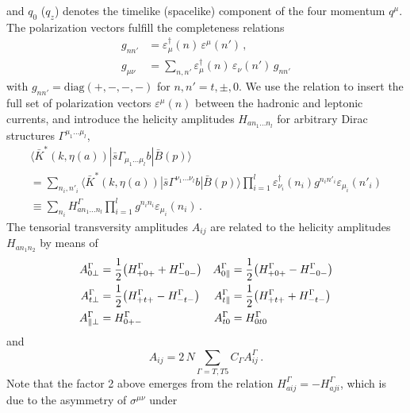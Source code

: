 and $q_0$ ($q_z$) denotes the timelike (spacelike) component of the four
momentum $q^\mu$. The polarization vectors fulfill the completeness relations
\begin{equation}
\begin{aligned}
    g_{nn'} & = \varepsilon^\dagger_\mu(n)\, \varepsilon^\mu(n')\,,\\
 g_{\mu\nu} & = \sum_{n,n'} \varepsilon^\dagger_\mu(n)\, \varepsilon_\nu(n')\, g_{nn'}
\end{aligned}\label{eq:heldecomp}
\end{equation}
with $g_{nn'} = \mbox{diag}(+,-,-,-)$ for $n,n' = t, \pm, 0$. We use
the relation   to insert the full set of polarization vectors
$\varepsilon^\mu(n)$ between the hadronic and leptonic currents, and introduce
the helicity amplitudes $H_{a n_1 \dots n_l}$ for arbitrary Dirac
structures $\Gamma^{\mu_1\dots\mu_l}$,
\begin{gather}
    \langle \bar{K}^*(k, \eta(a)) |\bar{s}\Gamma_{\mu_1\dots\mu_l} b|\bar{B}(p)\rangle\\
    \nonumber
    = \sum_{n_i,n'_i}
          \!\langle \bar{K}^*(k,\eta(a))|\bar{s}\Gamma^{\nu_1\dots\nu_l}b|\bar{B}(p)\rangle
      \prod_{i=1}^l \varepsilon^{\dagger}_{\nu_i}\!(n_i) g^{n_i n'_i} \varepsilon_{\mu_i}\!(n'_i)\\
    \equiv \sum_{n_i}
    H^\Gamma_{a n_1\dots n_l} \prod_{i=1}^l g^{n_i n_i} \varepsilon_{\mu_i}\!(n_i)\,.
\end{gather}
The tensorial transversity amplitudes $A_{ij}$ are related to the helicity
amplitudes $H_{a n_1 n_2}$ by means of
\begin{align}
    A^\Gamma_{0\perp}     & = \frac{1}{2} \big(H^\Gamma_{+0+} + H^\Gamma_{-0-}\big) &
    A^\Gamma_{0\parallel}     & = \frac{1}{2} \big(H^\Gamma_{+0+} - H^\Gamma_{-0-}\big)\nonumber\\
    A^\Gamma_{t\perp}     & = \frac{1}{2} \big(H^\Gamma_{+t+} - H^\Gamma_{-t-}\big) &
    A^\Gamma_{t\parallel}     & = \frac{1}{2} \big(H^\Gamma_{+t+} + H^\Gamma_{-t-}\big)\nonumber\\
    A^\Gamma_{\parallel\perp} & = H^\Gamma_{0+-} &
    A^\Gamma_{t0}         & = H^\Gamma_{0t0}
\end{align}
and
\begin{equation}
    A_{ij} = 2\, N \sum_{\Gamma=T,T5} C_\Gamma  A^\Gamma_{ij}\,.
\end{equation}
Note that the factor 2 above emerges from the relation $H_{a ij}^\Gamma =
 - H_{a ji}^\Gamma$, which is due to the asymmetry of $\sigma^{\mu\nu}$ under
